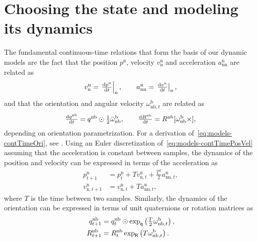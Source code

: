 \section{Choosing the state and modeling its dynamics}
\label{sec:models-stateDynamics}
The fundamental continuous-time relations that form the basis of our dynamic models are the fact that the position $p^\text{n}$, velocity $v^\text{n}_\text{n}$ and acceleration $a^\text{n}_\text{nn}$ are related as 
\begin{align}
v^\text{n}_\text{n} = \left. \tfrac{\textrm{d} p^\text{n}}{\textrm{d} t} \right|_\text{n}, \qquad
a^\text{n}_\text{nn} = \left. \tfrac{\textrm{d} v^\text{n}}{\textrm{d} t} \right|_\text{n},
\label{eq:models-contTimePosVel}
\end{align}
and that the orientation and angular velocity $\omega_{\text{nb},t}^\text{b}$ are related as
\begin{align}
\tfrac{\textrm{d} q^\text{nb}}{\textrm{d} t} = q^\text{nb} \odot \tfrac{1}{2}\bar{\omega}_{\text{nb}}^\text{b}, \qquad
\tfrac{\textrm{d} R^\text{nb}}{\textrm{d} t} = R^\text{nb} [\omega_{\text{nb}}^\text{b} \times],
\label{eq:models-contTimeOri}
\end{align}
depending on orientation parametrization. For a derivation of~\eqref{eq:models-contTimeOri}, see \eg \cite{hol:2011}. Using an Euler discretization of~\eqref{eq:models-contTimePosVel} assuming that the acceleration is constant between samples, the dynamics of the position and velocity can be expressed in terms of the acceleration as
\begin{subequations}
\label{eq:models-dynModelPosVel}
\begin{align}
p^\text{n}_{t+1} &=  p_t^\text{n} + T v_{\text{n},t}^\text{n} + \tfrac{T^2}{2} a^\text{n}_{\text{nn},t}, \\
v^\text{n}_{\text{n},t+1} &= v_{\text{n},t}^\text{n} + T a_{\text{nn},t}^\text{n}, 
\end{align}
\end{subequations}
where $T$ is the time between two samples. Similarly, the dynamics of the orientation can be expressed in terms of unit quaternions or rotation matrices as
\begin{subequations}
\label{eq:models-dynModelOri}
\begin{align}
q^\text{nb}_{t+1} &= q_t^\text{nb} \odot \exp_\mathsf{q} \left( \tfrac{T}{2} \omega^\text{b}_{\text{nb},t} \right), \\
R^\text{nb}_{t+1} &= R_t^\text{nb} \exp_\mathsf{R} \left( T \omega^\text{b}_{\text{nb},t} \right).
\end{align}
\end{subequations}

